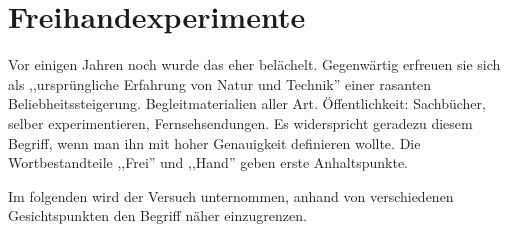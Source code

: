 \bip\bip
\section{Freihandexperimente}

Vor einigen Jahren noch wurde das eher bel\"{a}chelt. Gegenw\"{a}rtig erfreuen sie
sich als ,,urspr\"{u}ngliche Erfahrung von Natur und Technik'' einer rasanten
Beliebheitssteigerung. %
\mip
Begleitmaterialien aller Art.
\mip
\"{O}ffentlichkeit: Sachb\"{u}cher, selber experimentieren, Fernsehsendungen.
\mip
Es widerspricht geradezu diesem Begriff, wenn man ihn
mit hoher Genauigkeit definieren wollte.
\mip
Die Wortbestandteile ,,Frei'' und ,,Hand'' geben erste Anhaltspunkte.


Im folgenden wird der Versuch unternommen, anhand von
verschiedenen Gesichtspunkten den Begriff n\"{a}her einzugrenzen.

